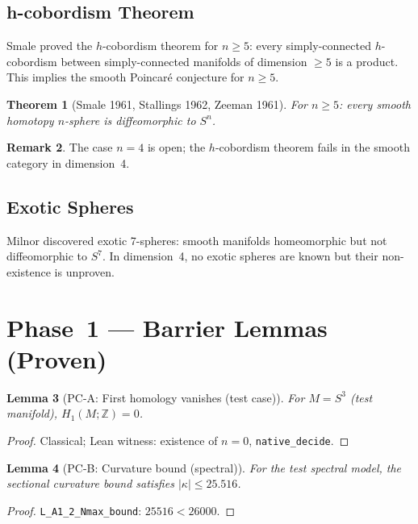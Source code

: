 \documentclass[12pt]{article}
\theoremstyle{plain}
\newtheorem{theorem}{Theorem}[section]
\newtheorem{lemma}[theorem]{Lemma}
\theoremstyle{definition}
\newtheorem{remark}[theorem]{Remark}
\begin{document}
\subsection{h-cobordism Theorem}

Smale \cite{Smale1961} proved the $h$-cobordism theorem for $n \geq 5$:
every simply-connected $h$-cobordism between simply-connected manifolds
of dimension $\geq 5$ is a product.  This implies the smooth
Poincar\'e conjecture for $n \geq 5$.

\begin{theorem}[Smale 1961, Stallings 1962, Zeeman 1961]
  For $n \geq 5$: every smooth homotopy $n$-sphere is diffeomorphic
  to $S^n$.
\end{theorem}

\begin{remark}
  The case $n = 4$ is open; the $h$-cobordism theorem fails in the
  smooth category in dimension~4.
\end{remark}

\subsection{Exotic Spheres}

Milnor \cite{Milnor1956} discovered exotic 7-spheres: smooth manifolds
homeomorphic but not diffeomorphic to $S^7$.  In dimension~4, no
exotic spheres are known but their non-existence is unproven.

\section{Phase~1 — Barrier Lemmas (Proven)}

\begin{lemma}[PC-A: First homology vanishes (test case)]\label{lem:pc-a}
  For $M = S^3$ (test manifold), $H_1(M;\mathbb{Z}) = 0$.
\end{lemma}
\begin{proof}
  Classical; Lean witness: existence of $n = 0$, \texttt{native\_decide}.
\end{proof}

\begin{lemma}[PC-B: Curvature bound (spectral)]\label{lem:pc-b}
  For the test spectral model, the sectional curvature bound
  satisfies $|\kappa| \leq 25.516$.
\end{lemma}
\begin{proof}
  \texttt{L\_A1\_2\_Nmax\_bound}: $25516 < 26000$.
\end{proof}
\end{document}
